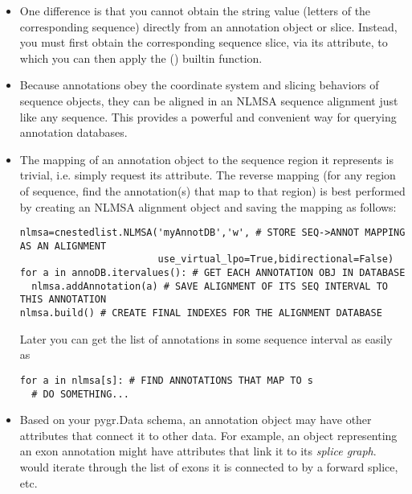 \documentclass{howto}
\begin{document}
\begin{itemize}
\item One difference is that you cannot obtain the string value
(letters of the corresponding sequence) directly from an annotation
object or slice.  Instead, you must first obtain the corresponding
sequence slice, via its  attribute, to which
you can then apply the () builtin function.

\item Because annotations obey the
coordinate system and slicing behaviors of sequence objects,
they can be aligned in an NLMSA sequence alignment just like any
sequence.  This provides a powerful and convenient way for
querying annotation databases.

\item The mapping of an annotation object to the sequence region it
represents is trivial, i.e. simply request its  attribute.
The reverse mapping (for any region of sequence, find the annotation(s) 
that map to that region) is best performed by creating an NLMSA alignment
object and saving the mapping as follows:
\begin{verbatim}
nlmsa=cnestedlist.NLMSA('myAnnotDB','w', # STORE SEQ->ANNOT MAPPING AS AN ALIGNMENT
                        use_virtual_lpo=True,bidirectional=False)
for a in annoDB.itervalues(): # GET EACH ANNOTATION OBJ IN DATABASE
  nlmsa.addAnnotation(a) # SAVE ALIGNMENT OF ITS SEQ INTERVAL TO THIS ANNOTATION
nlmsa.build() # CREATE FINAL INDEXES FOR THE ALIGNMENT DATABASE
\end{verbatim}
Later you can get the list of annotations in some sequence interval 
as easily as 
\begin{verbatim}
for a in nlmsa[s]: # FIND ANNOTATIONS THAT MAP TO s
  # DO SOMETHING...
\end{verbatim}

\item Based on your pygr.Data schema, an annotation object may
have other attributes that connect it to other data.
For example, an object  representing an exon annotation
might have attributes that link it
to its {\em splice graph}.   would iterate
through the list of exons it is connected to by a forward splice, etc.

\end{itemize}
\end{document}
